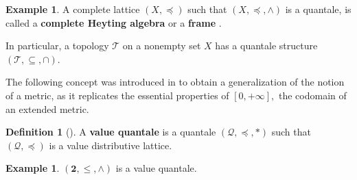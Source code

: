 \documentclass[11pt,a4paper]{amsart}
\theoremstyle{definition}
\newtheorem{definition}[theorem]{Definition}
\newtheorem{example}[theorem]{Example}
\begin{document}
	
	
	\begin{example}
		A complete lattice $(X,\preceq)$ such that $(X,\preceq,\wedge)$ is a quantale, is called a \textbf{complete Heyting algebra} or a \textbf{frame} \cite{GierzHoffKeiLawMisScott}.
		
		In particular, a topology $\mathcal{T}$ on a nonempty set $X$ has a quantale structure $(\mathcal{T},\subseteq,\cap).$
	\end{example}
	
	The following concept was introduced in \cite{Flagg97} to obtain a generalization of the notion of  a metric, as it replicates the essential properties of $[0,+\infty],$ the codomain of an extended metric.
	
	\begin{definition}[\cite{Flagg97,FlaggKopp97,CookWeiss21}]\label{def: value quantale}
		A \textbf{value quantale} is a quantale $(\mathscr{Q},\preceq,\ast)$ such that $(\mathscr{Q},\preceq)$ is a value distributive lattice.
	\end{definition}
	
	
	
	\begin{example}
		$(\mathbf{2},\leq,\wedge)$ is a value quantale.
	\end{example}
	
\end{document}

